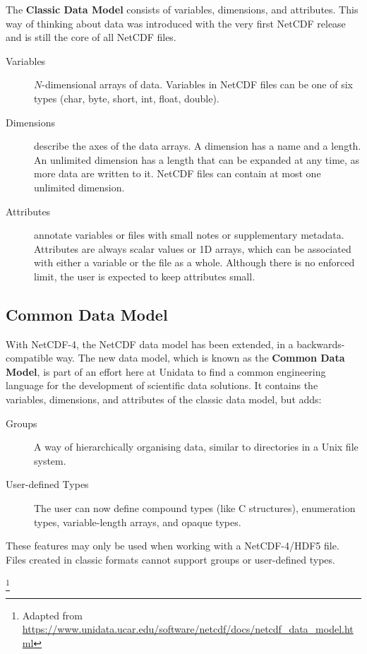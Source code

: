 {\itshape

The \textbf{Classic Data Model} consists of variables, dimensions, and attributes. This way of thinking about data was introduced with the very first NetCDF release and is still the core of all NetCDF files.

\begin{description}

\item[Variables] $N$-dimensional arrays of data. Variables in NetCDF files can be one of six types (char, byte, short, int, float, double).

\item[Dimensions] describe the axes of the data arrays. A dimension has a name and a length. An unlimited dimension has a length that can be expanded at any time, as more data are written to it. NetCDF files can contain at most one unlimited dimension.

\item[Attributes] annotate variables or files with small notes or supplementary metadata. Attributes are always scalar values or 1D arrays, which can be associated with either a variable or the file as a whole. Although there is no enforced limit, the user is expected to keep attributes small.

\end{description}

\subsection{Common Data Model}
\label{sec:common}

With NetCDF-4, the NetCDF data model has been extended, in a backwards-compatible way. The new data model, which is known as the \textbf{Common Data Model}, is part of an effort here at Unidata to find a common engineering language for the development of scientific data solutions. It contains the variables, dimensions, and attributes of the classic data model, but adds:

\begin{description}

\item[Groups] A way of hierarchically organising data, similar to directories in a Unix file system.

\item[User-defined Types] The user can now define compound types (like C structures), enumeration types, variable-length arrays, and opaque types.

\end{description}

These features may only be used when working with a NetCDF-4/HDF5 file. Files created in classic formats cannot support groups or user-defined types.
}\footnote{Adapted from \url{https://www.unidata.ucar.edu/software/netcdf/docs/netcdf_data_model.html}}

